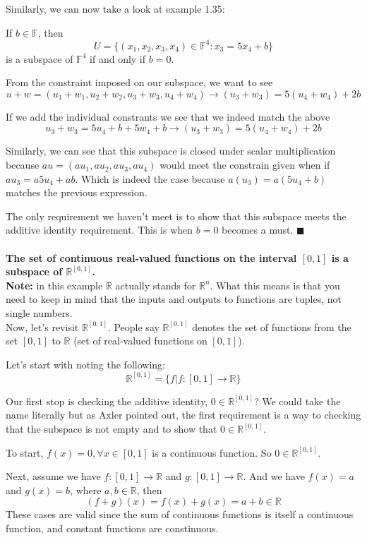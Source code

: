 Similarly, we can now take a look at example 1.35:

If $b\in \mathbb{F}$, then
$$
U = \{ (x_1, x_2, x_3, x_4) \in \mathbb{F}^4 : x_3 = 5x_4 + b \}
$$
is a subspace of $\mathbb{F}^4$ if and only if $b=0$.

From the constraint imposed on our subspace, we want to see
$$
u + w = (u_1+w_1, u_2+w_2, u_3+w_3, u_4+w_4) \rightarrow (u_3+w_3) = 5(u_4+w_4) + 2b
$$

If we add the individual constrants we see that we indeed match the above
$$
u_3 + w_3 = 5u_4 + b + 5w_4 + b \rightarrow (u_3+w_3) = 5(u_4+w_4) + 2b
$$

Similarly, we can see that this subspace is closed under scalar multiplication
because $au = (au_1, au_2, au_3, au_4)$ would meet the constrain given when if
$au_3 = a5u_4 + ab$.
Which is indeed the case because $a(u_3) = a(5u_4 + b)$ matches the previous expression.

The only requirement we haven't meet is to show that this subspace meets the additive identity requirement.
This is when $b=0$ becomes a must.
$\blacksquare$
\\~\\




\textbf{The set of continuous real-valued functions on the interval $[0,1]$ is a subspace of $\mathbb{R}^{[0,1]}$.}
\\


\textbf{Note:} in this example $\mathbb{R}$ actually stands for $\mathbb{R}^n$. What this means is
that you need to keep in mind that the inputs and outputs to functions are tuples, not single numbers.
\\

Now, let's revisit $\mathbb{R}^{[0,1]}$. People say $\mathbb{R}^{[0,1]}$ denotes the set of functions
from the set $[0,1]$ to $\mathbb{R}$ (set of real-valued functions on $[0,1]$).

Let's start with noting the following:
$$
\mathbb{R}^{[0,1]} = \{ f | f : [0,1] \rightarrow \mathbb{R}\}
$$

Our first stop is checking the additive identity, $0\in\mathbb{R}^{[0,1]}$?
We could take the name literally but as Axler pointed out, the first requirement is a way to checking
that the subspace is not empty and to show that $0\in \mathbb{R}^{[0,1]}$.

To start, $f(x) = 0, \forall x\in [0,1]$ is a continuous function.
So $0\in\mathbb{R}^{[0,1]}$.

Next, assume we have $f : [0,1]\rightarrow \mathbb{R}$ and $g : [0,1]\rightarrow \mathbb{R}$.
And we have $f(x) = a$ and $g(x) = b$, where $a,b\in\mathbb{R}$, then
$$
(f+g)(x) = f(x) + g(x) = a + b \in \mathbb{R}
$$
These cases are valid since the sum of continuous functions is itself a continuous function,
and constant functions are constinuous.

